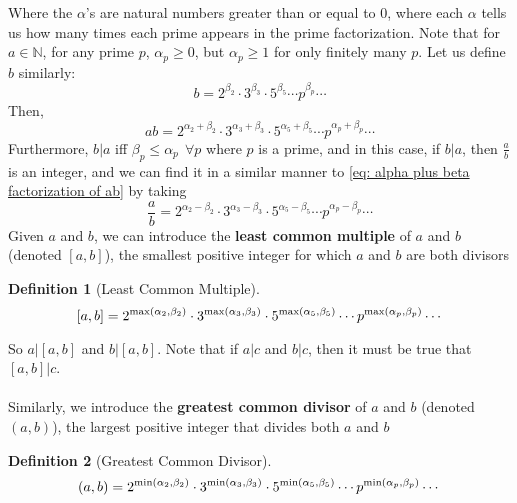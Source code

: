 \documentclass[10pt]{article}
\newcommand\NN{{\mathbb N}}
\theoremstyle{definition}
\newtheorem{definition}{Definition}[section]
\begin{document}
Where the $\alpha$'s are natural numbers greater than or equal to 0, where each $\alpha$ tells us how many times each prime appears in the prime factorization. Note that for $a\in\NN$, for any prime $p$, $\alpha_p\geq 0$, but $\alpha_p\geq 1$ for only finitely many $p$.  Let us define $b$ similarly: 
\begin{equation}
b = 2^{\beta_2}\cdot 3^{\beta_3} \cdot 5^{\beta_5} \cdots p^{\beta_p}\cdots 
\end{equation}
Then, 
\begin{equation}\label{eq: alpha plus beta factorization of ab}
ab = 2^{\alpha_2 + \beta_2} \cdot 3^{\alpha_3 + \beta_3} \cdot 5^{\alpha_5 + \beta_5} \cdots p^{\alpha_p + \beta_p} \cdots 
\end{equation}
Furthermore, $b|a$ iff $\beta_p \leq \alpha_p~~ \forall p$ where $p$ is a prime, and in this case, if $b|a$, then $\frac{a}{b}$ is an integer, and we can find it in a similar manner to \ref{eq: alpha plus beta factorization of ab} by taking 
\begin{equation}
\frac{a}{b}= 2^{\alpha_2 - \beta_2} \cdot 3^{\alpha_3 - \beta_3} \cdot 5^{\alpha_5 - \beta_5} \cdots p^{\alpha_p - \beta_p} \cdots 
\end{equation}
Given $a$ and $b$, we can introduce the \textbf{least common multiple} of $a$ and $b$ (denoted $[a,b]$), the smallest positive integer for which $a$ and $b$ are both divisors
\begin{definition}[Least Common Multiple]
\begin{equation} \label{lcm def}
[a,b] = 2^{\textnormal{max}(\alpha_2,\beta_2)}\cdot 3^{\textnormal{max}(\alpha_3,\beta_3)}\cdot 5^{\textnormal{max}(\alpha_5,\beta_5)}\cdots p^{\textnormal{max}(\alpha_p,\beta_p)}\cdots 
\end{equation}
\end{definition}
\noindent So $a|[a,b]$ and $b|[a,b]$.  Note that if $a|c$ and $b|c$, then it must be true that $[a,b]|c$.  \\~\\Similarly, we introduce the \textbf{greatest common divisor} of $a$ and $b$ (denoted $(a,b)$), the largest positive integer that divides both $a$ and $b$
\begin{definition}[Greatest Common Divisor]
\begin{equation} \label{lcm def}
(a,b) = 2^{\textnormal{min}(\alpha_2,\beta_2)}\cdot 3^{\textnormal{min}(\alpha_3,\beta_3)}\cdot 5^{\textnormal{min}(\alpha_5,\beta_5)}\cdots p^{\textnormal{min}(\alpha_p,\beta_p)}\cdots 
\end{equation}
\end{definition}
\end{document}
